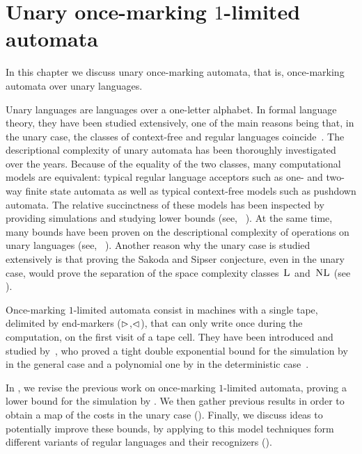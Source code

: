 \chapter{Unary once-marking \texorpdfstring{$1$}{1}-limited automata}\label{ch:oncemarking}
In this chapter we discuss unary once-marking automata, that is, once-marking automata over unary languages.

Unary languages are languages over a one-letter alphabet.
In formal language theory, they have been studied extensively, one of the main reasons being that, in the unary case, the classes of context-free and regular languages coincide~\cite{GinRic62}.
The descriptional complexity of unary automata has been thoroughly investigated over the years.
Because of the equality of the two classes, many computational models are equivalent: typical regular language acceptors such as one- and two-way finite state automata as well as typical context-free models such as pushdown automata.
The relative succinctness of these models has been inspected by providing simulations and studying lower bounds (see, \eg[,]~\cite{GefMer+03,MerPig01,Pig09,PigSha+02}).
At the same time, many bounds have been proven on the descriptional complexity of operations on unary languages (see, \eg[,]~\cite{HolKut03,KunOkh12,MerPig05,PigSha02}).
Another reason why the unary case is studied extensively is that proving the Sakoda and Sipser conjecture, even in the unary case, would prove the separation of the space complexity classes~$\textsc{L}$ and~$\textsc{NL}$ (see ).

Once-marking $1$-limited automata consist in machines with a single tape, delimited by end-markers ($\rhd$,$\lhd$), that can only write once during the computation, on the first visit of a tape cell.
They have been introduced and studied by~\citeauthor{PigPri23a}, who proved a tight double exponential bound for the simulation by \ODFAs in the general case and a polynomial one by \TDFAs in the deterministic case~\cite{PigPri23a}.

In , we revise the previous work on once-marking $1$-limited automata, proving a lower bound for the simulation by \ONFAs.
We then gather previous results in order to obtain a map of the costs in the unary case ().
Finally, we discuss ideas to potentially improve these bounds, by applying to this model techniques form different variants of regular languages and their recognizers ().



